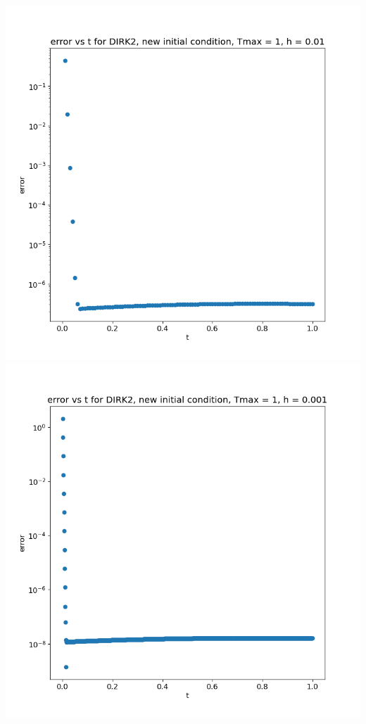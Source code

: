 \documentclass{article}
\begin{document}
\begin{enumerate}
\begin{enumerate}[label=(\alph*)]
\begin{center}
		\includegraphics[scale=.3]{hw3 dirk2 err vs t graph 5}
		\includegraphics[scale=.3]{hw3 dirk2 err vs t graph 6}
		

\end{center}
\end{enumerate}
\end{enumerate}
\end{document}

